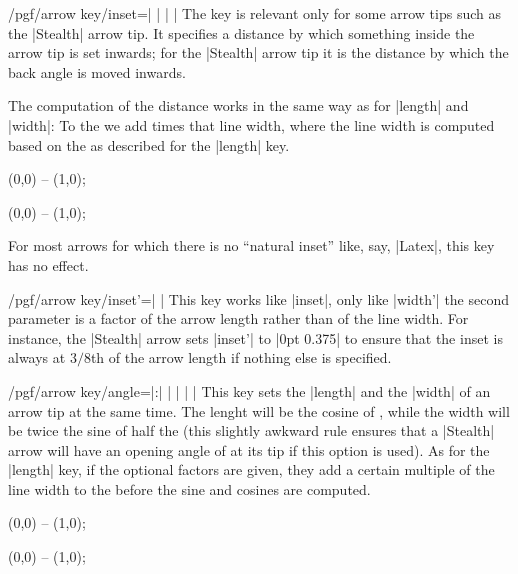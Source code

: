\begin{key}{/pgf/arrow key/inset=| |%
    | |}
  The key is relevant only for some arrow tips such as the |Stealth|
  arrow tip. It specifies a distance by which something inside the
  arrow tip is set inwards; for the |Stealth| arrow tip it is the
  distance by which the back angle is moved inwards.

  The computation of the distance works in the same way as for
  |length| and |width|: To the  we add  times that line width, where the line width is
  computed based on the  as described for the
  |length| key.
\begin{codeexample}[]
\tikz \draw [arrows = {-Stealth[length=10pt, inset=5pt]}] (0,0) -- (1,0);
\end{codeexample}
\begin{codeexample}[]
\tikz \draw [arrows = {-Stealth[length=10pt, inset=2pt]}] (0,0) -- (1,0);
\end{codeexample}

  For most arrows for which there is no ``natural inset'' like, say,
  |Latex|, this key has no effect.
\end{key}


\begin{key}{/pgf/arrow key/inset'=| |}
  This key works like |inset|, only like |width'| the second parameter
  is a factor of the arrow length rather than of the line width. For
  instance, the |Stealth| arrow sets |inset'| to |0pt 0.375| to ensure
  that the inset is always at $3/8$th of the arrow length if nothing
  else is specified.
\end{key}



\begin{key}{/pgf/arrow key/angle=|:|%
    | |%
    | |}
  This key sets the |length| and the |width| of an arrow tip at the
  same time. The lenght will be the cosine of , while the
  width will be twice the sine of half the  (this slightly
  awkward rule ensures that a |Stealth| arrow will have an opening
  angle of  at its tip if this option is used). As for the
  |length| key, if the optional factors are given, they add a certain
  multiple of the line width to the  before the sine
  and cosines are computed.
\begin{codeexample}[]
\tikz \draw [arrows = {-Stealth[inset=0pt, angle=90:10pt]}] (0,0) -- (1,0);
\end{codeexample}
\begin{codeexample}[]
\tikz \draw [arrows = {-Stealth[inset=0pt, angle=30:10pt]}] (0,0) -- (1,0);
\end{codeexample}
\end{key}


